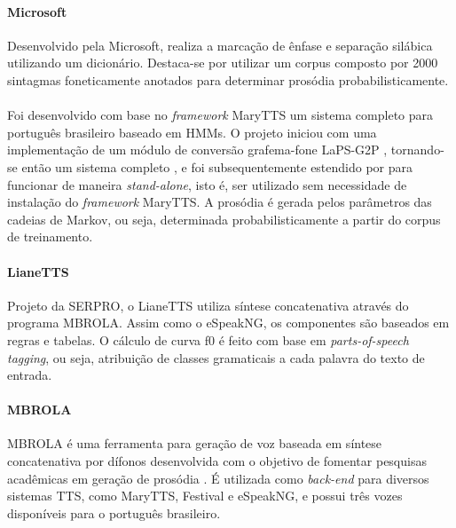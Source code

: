 \paragraph{Microsoft \cite{hmmmicrosoft}}
Desenvolvido pela Microsoft, realiza a marcação de ênfase e separação silábica
utilizando um dicionário. Destaca-se por utilizar um corpus composto por 2000
sintagmas foneticamente anotados para determinar prosódia probabilisticamente.

\paragraph{\cite{couto}}
Foi desenvolvido com base no \emph{framework} MaryTTS um sistema completo para
português brasileiro baseado em HMMs. O projeto iniciou com uma implementação
de um módulo de conversão grafema-fone LaPS-G2P \cite{g2pusp}, tornando-se então
um sistema completo \cite{couto}, e foi subsequentemente estendido por
\cite{costa} para funcionar de maneira \emph{stand-alone}, isto é, ser utilizado
sem necessidade de instalação do \emph{framework} MaryTTS. A prosódia é gerada
pelos parâmetros das cadeias de Markov, ou seja, determinada probabilisticamente
a partir do corpus de treinamento.


\paragraph{LianeTTS \cite{lianetts}}
Projeto da SERPRO, o LianeTTS utiliza síntese concatenativa através do programa
MBROLA. Assim como o eSpeakNG, os componentes são baseados em regras e tabelas.
O cálculo de curva f0 é feito com base em \emph{parts-of-speech tagging}, ou
seja, atribuição de classes gramaticais a cada palavra do texto de entrada.

\paragraph{MBROLA}
\label{sec:mbrola}
MBROLA é uma ferramenta para geração de voz baseada em síntese concatenativa por
dífonos desenvolvida com o objetivo de fomentar pesquisas acadêmicas em geração
de prosódia \cite{mbrola}. É utilizada como \emph{back-end} para diversos
sistemas TTS, como MaryTTS, Festival \cite{festival} e eSpeakNG, e possui três vozes disponíveis para o português brasileiro. %

